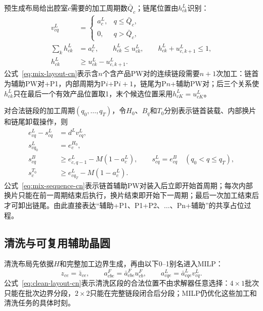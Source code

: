 \documentclass[final,5p,times,twocolumn]{elsarticle}
\begin{document}
预生成布局给出腔室$c$需要的加工周期数$\bar Q_c$；链尾位置由$h^L_{ck}$识别：
\begin{equation}
\begin{aligned}
v^L_{cq}&=
\begin{cases}a^L_c,&q\le\bar Q_c,\\0,&q>\bar Q_c,
\end{cases}\\
\sum_k h^L_{ck}&=a^L_c,\qquad
h^L_{ck}\le u^L_{ck},\qquad
h^L_{ck}+u^L_{c,k+1}\le1,\\
h^L_{ck}&\ge u^L_{ck}-u^L_{c,k+1}.
\end{aligned}
\label{eq:mix-layout-cn}
\end{equation}
公式~\eqref{eq:mix-layout-cn}表示含$n$个含产品PW对的连续链段需要$n+1$次加工：链首为辅助PW对+P1，内部周期为P$i$+P$i+1$，链尾为P$n$+辅助PW对；后三个关系使$h^L_{ck}$只在最后一个有效产品位置取1，末个候选位置采用$h^L_{cK}=u^L_{cK}$。

对合法链段的加工周期$(q_0,\ldots,q_T)$，令$H_0$、$B_q$和$T_0$分别表示链首装载、内部换片和链尾卸载操作，则
\begin{equation}
\begin{aligned}
e^L_{cq}-s^L_{cq}&=d^L v^L_{cq},\\
s^L_{cq_0}&=e^{H_0}_c,\\
s^{B}_{cq}&\ge e^L_{c,q-1}-M(1-a^L_c),\qquad
s^L_{cq}=e^{B}_{cq}\quad(q_0<q\le q_T),\\
s^{T_0}_c&\ge e^L_{cq_T}-M(1-a^L_c).
\end{aligned}
\label{eq:mix-sequence-cn}
\end{equation}
公式~\eqref{eq:mix-sequence-cn}表示链首辅助PW对装入后立即开始首周期；每次内部换片只能在前一周期结束后执行，换片结束即开始下一周期；最后一次加工结束后才可卸出链尾。由此直接表达“辅助+P1、P1+P2、$\ldots$、Pn+辅助”的共享占位过程。

\subsection{清洗与可复用辅助晶圆}

清洗布局先依据$H$和完整加工边界生成，再由以下0--1别名进入MILP：
\begin{equation}
z_{ce}=\bar z_{ce},\qquad
a^F_{cbe}=\bar a^F_{cbe}u^F_{cb},\qquad
a^L_{cqe}=\bar a^L_{cqe}v^L_{cq}.
\label{eq:clean-layout-cn}
\end{equation}
公式~\eqref{eq:clean-layout-cn}表示清洗区段的合法位置不由求解器任意选择：$4\times1$批次只能在批次边界分段，$2\times2$只能在完整链段闭合后分段；MILP仍优化这些加工和清洗任务的具体时刻。
\end{document}
